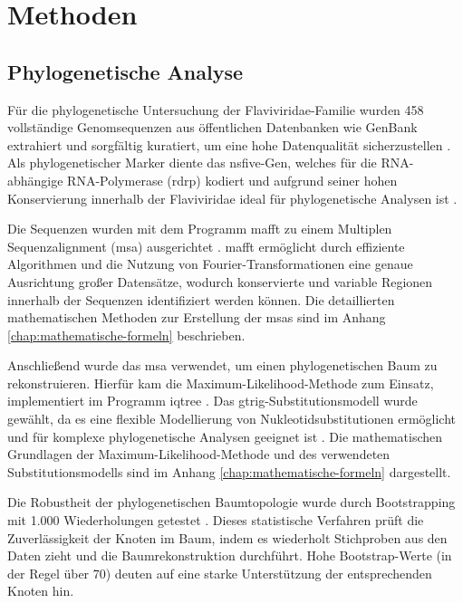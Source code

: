 \chapter{Methoden} \label{chap:methoden}

\section{Phylogenetische Analyse} \label{sec:phylogenetische-analyse}

Für die phylogenetische Untersuchung der Flaviviridae-Familie wurden 458 vollständige Genomsequenzen aus öffentlichen Datenbanken wie GenBank extrahiert und sorgfältig kuratiert, um eine hohe Datenqualität sicherzustellen \autocite{mifsudMappingGlycoproteinStructure2024}. Als phylogenetischer Marker diente das \gls{nsfive}-Gen, welches für die RNA-abhängige RNA-Polymerase (\gls{rdrp}) kodiert und aufgrund seiner hohen Konservierung innerhalb der Flaviviridae ideal für phylogenetische Analysen ist \autocite{Koonin1991}.

Die Sequenzen wurden mit dem Programm \gls{mafft} zu einem Multiplen Sequenzalignment (\gls{msa}) ausgerichtet \autocite{Katoh2013}. \gls{mafft} ermöglicht durch effiziente Algorithmen und die Nutzung von Fourier-Transformationen eine genaue Ausrichtung großer Datensätze, wodurch konservierte und variable Regionen innerhalb der Sequenzen identifiziert werden können. Die detaillierten mathematischen Methoden zur Erstellung der \glspl{msa} sind im Anhang \ref{chap:mathematische-formeln} beschrieben.

Anschließend wurde das \gls{msa} verwendet, um einen phylogenetischen Baum zu rekonstruieren. Hierfür kam die Maximum-Likelihood-Methode zum Einsatz, implementiert im Programm \gls{iqtree} \autocite{Nguyen2015}. Das \gls{gtrig}-Substitutionsmodell wurde gewählt, da es eine flexible Modellierung von Nukleotidsubstitutionen ermöglicht und für komplexe phylogenetische Analysen geeignet ist \autocite{Tavare1986}. Die mathematischen Grundlagen der Maximum-Likelihood-Methode und des verwendeten Substitutionsmodells sind im Anhang \ref{chap:mathematische-formeln} dargestellt.

Die Robustheit der phylogenetischen Baumtopologie wurde durch Bootstrapping mit 1.000 Wiederholungen getestet \autocite{Felsenstein1985}. Dieses statistische Verfahren prüft die Zuverlässigkeit der Knoten im Baum, indem es wiederholt Stichproben aus den Daten zieht und die Baumrekonstruktion durchführt. Hohe Bootstrap-Werte (in der Regel über 70\text{\%}) deuten auf eine starke Unterstützung der entsprechenden Knoten hin.

